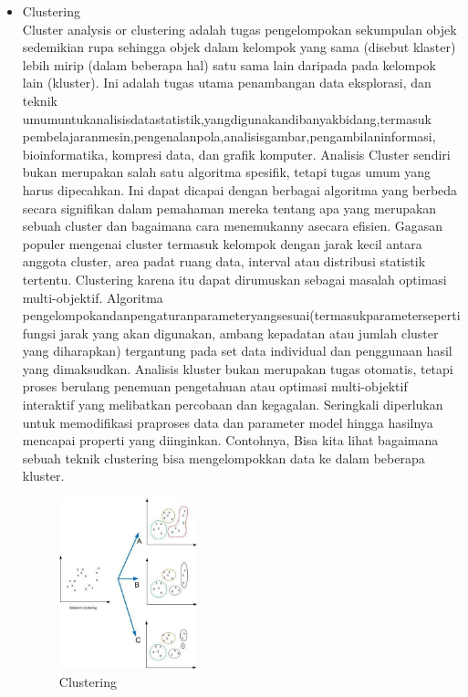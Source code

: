 \begin{enumerate}
\begin{itemize}
\item Clustering \\
 Cluster analysis or clustering adalah tugas pengelompokan sekumpulan objek sedemikian rupa sehingga objek dalam kelompok yang sama (disebut klaster) lebih mirip (dalam beberapa hal) satu sama lain daripada pada kelompok lain (kluster). Ini adalah tugas utama penambangan data eksplorasi, dan teknik umumuntukanalisisdatastatistik,yangdigunakandibanyakbidang,termasuk pembelajaranmesin,pengenalanpola,analisisgambar,pengambilaninformasi, bioinformatika, kompresi data, dan graﬁk komputer. Analisis Cluster sendiri bukan merupakan salah satu algoritma spesiﬁk, tetapi tugas umum yang harus dipecahkan. Ini dapat dicapai dengan berbagai algoritma yang berbeda secara signiﬁkan dalam pemahaman mereka tentang apa yang merupakan sebuah cluster dan bagaimana cara menemukanny asecara eﬁsien. Gagasan populer mengenai cluster termasuk kelompok dengan jarak kecil antara anggota cluster, area padat ruang data, interval atau distribusi statistik tertentu. Clustering karena itu dapat dirumuskan sebagai masalah optimasi multi-objektif. Algoritma pengelompokandanpengaturanparameteryangsesuai(termasukparameterseperti fungsi jarak yang akan digunakan, ambang kepadatan atau jumlah cluster yang diharapkan) tergantung pada set data individual dan penggunaan hasil yang dimaksudkan. Analisis kluster bukan merupakan tugas otomatis, tetapi proses berulang penemuan pengetahuan atau optimasi multi-objektif interaktif yang melibatkan percobaan dan kegagalan. Seringkali diperlukan untuk memodiﬁkasi praproses data dan parameter model hingga hasilnya mencapai properti yang diinginkan. Contohnya, Bisa kita lihat bagaimana sebuah teknik clustering bisa mengelompokkan data ke dalam beberapa kluster.
\begin{figure}[H]
		\includegraphics[width=4cm]{figures/1174073/2/clustering.jpg}
		\centering
		\caption{Clustering}
\end{figure}
\end{itemize}


\end{enumerate}
